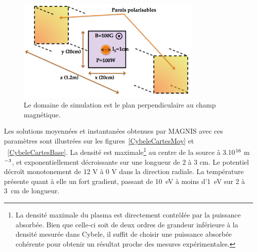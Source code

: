 \begin{refsection}
\begin{figure}[!htbp]
\centering
\includegraphics[width=0.8\textwidth]{figures/4-cybeleSimDomain.png}
{\caption{Le domaine de simulation est le plan perpendiculaire au champ
magnétique.}
\label{4-cybeleSimDomain}}
\end{figure}

Les solutions moyennées et instantanées obtenues par MAGNIS avec ces paramètres
sont illustrées sur les figures~\ref{CybeleCartesMoy} et
~\ref{CybeleCartesBase}. La densité est maximale\footnote{La densité maximale du plasma est directement contrôlée par la puissance
absorbée. Bien que celle-ci soit de deux ordres de grandeur inférieure à la
densité mesurée dans Cybele, il suffit de choisir une puissance absorbée
cohérente pour obtenir un résultat proche des mesures expérimentales.} au centre
de la source à 3.10$^{{16}}$ m$^{{-3}}$, et
exponentiellement décroissante sur une longueur de 2 à 3 cm. Le potentiel
décroît monotonement de 12 V à 0 V dans la direction radiale.
 La température présente quant à elle un fort gradient, passant de 10~eV à moins
 d'1~eV sur 2 à 3~cm de longueur.


\end{refsection}
